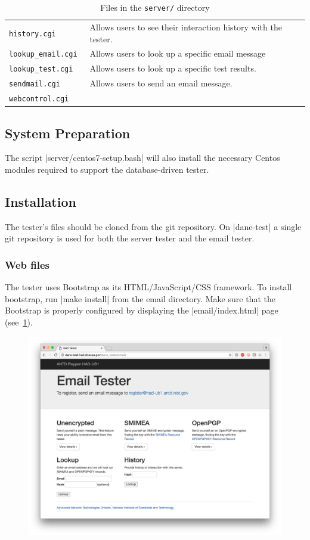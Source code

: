 \documentclass[preprint,3p]{elsarticle}
\begin{document}
\begin{table}
\begin{tabularx}{\textwidth}{>{\tt}lX}
history.cgi       & Allows users to see their interaction history with the tester.\\
lookup\_email.cgi & Allows users to look up a specific email message\\
lookup\_test.cgi  & Allows users to look up a specific test results.\\
sendmail.cgi      & Allows users to send an email message. \\
webcontrol.cgi    & \\
\end{tabularx}
\caption{Files in the \texttt{server/} directory}\label{tlsa}
\end{table}

\subsection{System Preparation}
The script |server/centos7-setup.bash| will also install the necessary
Centos modules required to support the database-driven tester.

\subsection{Installation}
The tester's files should be cloned from the git repository. On
|dane-test| a single git repository is used for both the server tester
and the email tester.

\subsubsection{Web files}

The tester uses Bootstrap as its HTML/JavaScript/CSS framework. To
install bootstrap, run |make install| from the email directory. Make
sure that the Bootstrap is properly configured by displaying the
|email/index.html| page (see~\ref{email-home}).

\begin{figure}
\begin{center}
\includegraphics[width=6in]{email-home}
\end{center}
\caption{}\label{email-home}
\end{figure}
\end{document}
